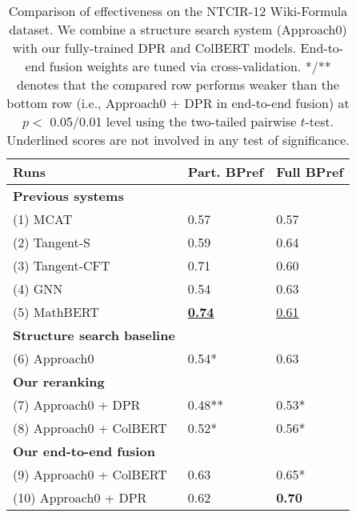 \documentclass[11pt]{article}
\begin{document}
\begin{table}
\small
\centering
\caption{\label{tab:fusion_ntcir}
Comparison of effectiveness on the NTCIR-12 Wiki-Formula dataset. We combine a structure search system (Approach0) with our fully-trained DPR and ColBERT models.
End-to-end fusion weights are tuned via cross-validation.
*/** denotes that the compared row performs weaker than the bottom row (i.e., Approach0 + DPR in end-to-end fusion) at $p<$ 0.05/0.01
level using the two-tailed pairwise $t$-test.
Underlined scores are not involved in any test of significance.
}
\hspace*{-0.1in}
\begin{tabular}{l|ll}
\toprule
    \bf Runs & Part. BPref & Full BPref \\
\midrule
\bf Previous  systems && \\
(1) MCAT \citeyearpar{kristianto2016mcat}
& 0.57 & 0.57 \\
(2) Tangent-S \citeyearpar{davila2017layout}
& 0.59 & 0.64 \\
(3) Tangent-CFT \citeyearpar{mansouri2019tangentcft}
& 0.71 & 0.60 \\
(4) GNN \citeyearpar{song2021GNN}
& 0.54 & 0.63 \\
(5) MathBERT \citeyearpar{peng2021mathbert}
&\bf \underline{0.74} & \underline{0.61} \\[0.75ex]
\bf Structure search baseline && \\
(6) Approach0~\citeyearpar{zhong2019structural,zhong2020accelerating}
& 0.54* & 0.63 \\[0.75ex]
\bf Our reranking && \\
(7) Approach0 + DPR
& 0.48** & 0.53* \\
(8) Approach0 + ColBERT
& 0.52* & 0.56* \\[0.75ex]
\bf Our end-to-end fusion && \\
(9) Approach0 + ColBERT
& 0.63 & 0.65* \\
(10) Approach0 + DPR
& 0.62 &\bf 0.70 \\
\bottomrule
\end{tabular}
\end{table}
\end{document}
